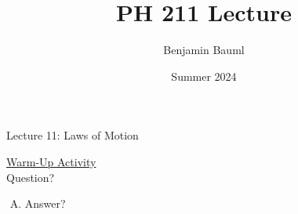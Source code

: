 \documentclass[]{article}
\title{PH 211 Lecture \Week}
\author{Benjamin Bauml}
\date{Summer 2024}
\newcommand{\Week}{11}
\begin{document}
\begin{TeacherMargin}

\end{TeacherMargin}
\begin{PresentSpace}
\begin{center}
	\huge Lecture \Week: Laws of Motion
\end{center}
\vspace{0.5cm}
\underline{Warm-Up Activity} \\
Question?
\begin{enumerate}[(A)]
	\item Answer?
\end{enumerate}
\end{PresentSpace}
\newpage
\end{document}
